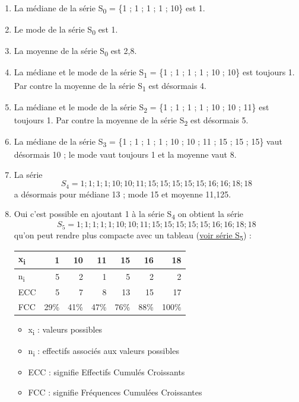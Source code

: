 \documentclass[11pt]{article}
\begin{document}
\begin{enumerate}
\item La médiane de  la série S\textsubscript{0} = \{1 ; 1 ; 1 ; 1 ; 10\} est 1.
\item Le mode de  la série S\textsubscript{0} est 1.
\item La moyenne de  la série S\textsubscript{0} est 2,8.
\item La médiane et le mode de la série S\textsubscript{1} = \{1 ; 1 ; 1 ; 1 ; 10 ;
10\} est toujours 1. Par contre la moyenne de la série S\textsubscript{1} est
désormais 4.
\item La médiane et le mode de la série S\textsubscript{2} = \{1 ; 1 ; 1 ; 1 ; 10 ; 10
; 11\} est toujours 1. Par contre la moyenne de la série S\textsubscript{2} est
désormais 5.
\item La médiane de la série S\textsubscript{3} = \{1 ; 1 ; 1 ; 1 ; 10 ; 10 ; 11 ; 15 ;
15 ; 15\} vaut désormais 10 ; le mode vaut toujours 1 et la
moyenne vaut 8.
\item La série \[S_4 = {1 ; 1 ; 1 ; 1 ; 10 ; 10 ; 11 ; 15 ; 15 ; 15 ; 15
   ; 15 ; 16 ; 16 ; 18 ; 18}\] a désormais pour médiane 13 ; mode 15
et moyenne 11,125.
\item Oui c'est possible en ajoutant 1 à la série S\textsubscript{4} on obtient la
série \[S_5 = {1 ; 1 ; 1 ; 1 ; 1 ; 10 ; 10 ; 11 ; 15 ; 15 ; 15 ;
   15 ; 15 ; 16 ; 16 ; 18 ; 18}\] qu'on peut rendre plus compacte
avec un tableau (\hyperref[orge8093f5]{voir série S\textsubscript{5}}) :
\label{orge8093f5}
\begin{center}
\begin{tabular}{lrrrrrr}
\hline
x\textsubscript{i} & 1 & 10 & 11 & 15 & 16 & 18\\[0pt]
\hline
n\textsubscript{i} & 5 & 2 & 1 & 5 & 2 & 2\\[0pt]
\hline
ECC & 5 & 7 & 8 & 13 & 15 & 17\\[0pt]
\hline
FCC & 29\% & 41\% & 47\% & 76\% & 88\% & 100\%\\[0pt]
\hline
\end{tabular}
\end{center}

\begin{itemize}
\item x\textsubscript{i} : valeurs possibles
\item n\textsubscript{i} : effectifs associés aux valeurs possibles
\item ECC : signifie Effectifs Cumulés Croissants
\item FCC : signifie Fréquences Cumulées Croissantes
\end{itemize}


\end{enumerate}
\end{document}
